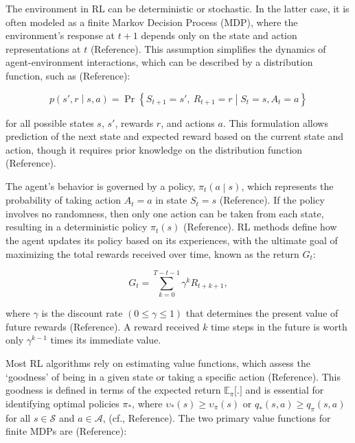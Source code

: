 The environment in RL can be deterministic or stochastic. In the latter
case, it is often modeled as a finite Markov Decision Process (MDP),
where the environment's response at \(t + 1\) depends only on the state
and action representations at \(t\) (\colorbox{yellow!40}{Reference}). This assumption
simplifies the dynamics of agent-environment interactions, which can be
described by a distribution function, such as (\colorbox{yellow!40}{Reference}):

\begin{equation}
p\left( s',r \middle| s,a \right) = \Pr\left\{ S_{t + 1} = s',\ R_{t + 1} = r \middle| S_{t} = s,A_{t} = a \right\}
\tag{1}
\end{equation}

for all possible states \(s\), \(s'\), rewards \(r\), and actions \(a\).
This formulation allows prediction of the next state and expected reward
based on the current state and action, though it requires prior
knowledge on the distribution function (\colorbox{yellow!40}{Reference}).

The agent's behavior is governed by a policy,
\(\pi_{t}\left( a \middle| s \right)\), which represents the probability
of taking action \(A_{t} = a\) in state \(S_{t} = s\) (\colorbox{yellow!40}{Reference}).
If the policy involves no randomness, then only one action can be taken
from each state, resulting in a deterministic policy \(\pi_{t}(s)\)
(\colorbox{yellow!40}{Reference}). RL methods define how the agent updates its policy
based on its experiences, with the ultimate goal of maximizing the total
rewards received over time, known as the return \(G_{t}\):

\begin{equation}
G_{t} = \sum_{k = 0}^{T - t - 1}{\gamma^{k}R_{t + k + 1},}
\tag{2}
\end{equation}

where \(\gamma\) is the discount rate \((0 \leq \gamma \leq 1)\) that
determines the present value of future rewards (\colorbox{yellow!40}{Reference}). A
reward received \(k\) time steps in the future is worth only
\(\gamma^{k - 1}\) times its immediate value.

Most RL algorithms rely on estimating value functions, which assess the
`goodness' of being in a given state or taking a specific action
(\colorbox{yellow!40}{Reference}). This goodness is defined in terms of the expected
return \(\mathbb{E}_{\pi}\lbrack.\rbrack\) and is essential for
identifying optimal policies \(\pi_{*}\), where
\(\upsilon_{*}(s) \geq \upsilon_{\pi}(s)\) or
\(q_{*}(s,a) \geq q_{\pi}(s,a)\) for all \(s \in \mathcal{S}\) and
\(a \in \mathcal{A}\), (\colorbox{yellow!40}{cf., Reference}). The two primary value
functions for finite MDPs are (\colorbox{yellow!40}{Reference}):

